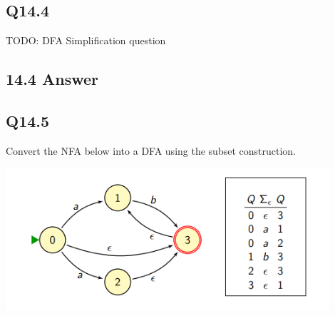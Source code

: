 \documentclass{article}
\begin{document}
\subsection*{Q14.4}
TODO: DFA Simplification question
\newpage
\subsection*{14.4 Answer}
\newpage
\subsection*{Q14.5}
Convert the NFA below into a DFA using the subset construction.
\begin{center}
    \includegraphics[width=12cm]{3.png}
\end{center}
\newpage
\end{document}
